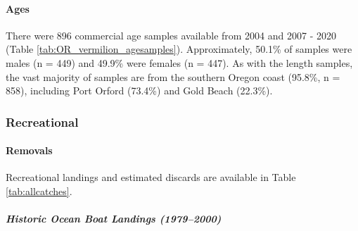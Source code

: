 \documentclass[11pt,
  english,
  a4paper,
]{article}
\begin{document}
\leavevmode\tagmcend\tagstructend\par


\hypertarget{ages}{%
\paragraph{Ages}\label{ages}}

\leavevmode\tagmcend\tagstructend


There were 896 commercial age samples available from 2004 and 2007 - 2020 (Table \ref{tab:OR_vermilion_agesamples}). Approximately, 50.1\% of samples were males (n = 449) and 49.9\% were females (n = 447). As with the length samples, the vast majority of samples are from the southern Oregon coast (95.8\%, n = 858), including Port Orford (73.4\%) and Gold Beach (22.3\%).

\leavevmode\tagmcend\tagstructend\par


\hypertarget{recreational}{%
\subsubsection{Recreational}\label{recreational}}

\leavevmode\tagmcend\tagstructend


\hypertarget{removals}{%
\paragraph{Removals}\label{removals}}

\leavevmode\tagmcend\tagstructend


Recreational landings and estimated discards are available in Table \ref{tab:allcatches}.

\leavevmode\tagmcend\tagstructend\par


\hypertarget{historic-ocean-boat-landings-19792000}{%
\subparagraph{Historic Ocean Boat Landings (1979--2000)}\label{historic-ocean-boat-landings-19792000}}
\end{document}
